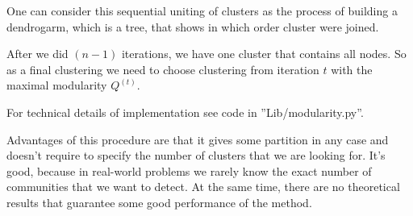 One can consider this sequential uniting of clusters as the process of building a dendrogarm, which is a tree, that shows in which order cluster were joined.

After we did $(n-1)$ iterations, we have one cluster that contains all nodes. So as a final clustering we need to choose clustering from iteration $t$ with the maximal modularity $Q^{(t)}$.

For technical details of implementation see code in ''Lib/modularity.py''.

Advantages of this procedure are that it gives some partition in any case and doesn't require to specify the number of clusters that we are looking for. It's good, because in real-world problems we rarely know the exact number of communities that we want to detect. At the same time, there are no theoretical results that guarantee some good performance of the method.



\begin{equation}
    \begin{aligned}
    \nonumber
    \end{aligned}
\end{equation}
